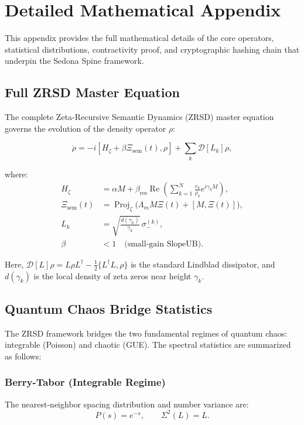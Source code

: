 \documentclass[12pt]{article}
\theoremstyle{plain}
\theoremstyle{definition}
\theoremstyle{remark}
\begin{document}
\appendix
\section{Detailed Mathematical Appendix}

This appendix provides the full mathematical details of the core operators, statistical distributions, contractivity proof, and cryptographic hashing chain that underpin the Sedona Spine framework.

\subsection{Full ZRSD Master Equation}

The complete Zeta-Recursive Semantic Dynamics (ZRSD) master equation governs the evolution of the density operator $\rho$:

\[
\dot{\rho} = -i[H_\zeta + \beta\Xi_{\text{sem}}(t), \rho] + \sum_k \mathcal{D}[L_k]\rho,
\]

where:
\begin{align}
H_\zeta &= \alpha M + \beta_{\text{res}} \operatorname{Re}\left( \sum_{k=1}^N \frac{c_k}{\rho_k} e^{i\gamma_k M} \right), \\
\Xi_{\text{sem}}(t) &= \operatorname{Proj}_\zeta\bigl( \Lambda_m M \Xi(t) + [M, \Xi(t)] \bigr), \\
L_k &= \sqrt{\frac{d(\gamma_k)}{\gamma_k}}\, \sigma_-^{(k)}, \\
\beta &< 1 \quad \text{(small-gain SlopeUB)}.
\end{align}

Here, $\mathcal{D}[L]\rho = L\rho L^\dagger - \frac{1}{2}\{L^\dagger L, \rho\}$ is the standard Lindblad dissipator, and $d(\gamma_k)$ is the local density of zeta zeros near height $\gamma_k$.

\subsection{Quantum Chaos Bridge Statistics}

The ZRSD framework bridges the two fundamental regimes of quantum chaos: integrable (Poisson) and chaotic (GUE). The spectral statistics are summarized as follows:

\subsubsection{Berry-Tabor (Integrable Regime)}
The nearest-neighbor spacing distribution and number variance are:
\[
P(s) = e^{-s}, \qquad \Sigma^2(L) = L.
\]
\end{document}
